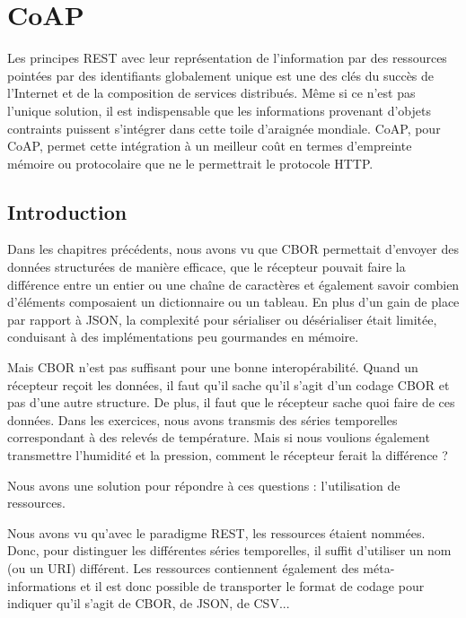 \chapter{CoAP}

Les principes \ac{REST} avec leur représentation de l'information par des ressources pointées par des identifiants globalement unique est une des clés du succès de l'Internet et de la composition de services distribués. Même si ce n'est pas l'unique solution, il est indispensable que les informations provenant d'objets contraints puissent s'intégrer dans cette toile d'araignée mondiale. \acs{CoAP}, pour \acl{CoAP}, permet cette intégration à un meilleur coût en termes d'empreinte mémoire ou protocolaire que ne le permettrait le protocole \ac{HTTP}.

\section{Introduction}

Dans les chapitres précédents, nous avons vu que \ac{CBOR} permettait d’envoyer des données structurées de manière efficace, que le récepteur pouvait faire la différence entre un entier ou une chaîne de caractères et également savoir combien d’éléments composaient un dictionnaire ou un tableau. En plus d’un gain de place par rapport à \ac{JSON}, la complexité pour sérialiser ou désérialiser était limitée, conduisant à des implémentations peu gourmandes en mémoire.

         \vspace{1em}


Mais CBOR n’est pas suffisant pour une bonne interopérabilité. Quand un récepteur reçoit les données, il faut qu'il sache qu’il s’agit d’un codage CBOR et pas d'une autre structure. De plus, il faut que le récepteur sache quoi faire de ces données. Dans les exercices, nous avons transmis des séries temporelles correspondant à des relevés de température. Mais si nous voulions également transmettre l’humidité et la pression, comment le récepteur ferait la différence ?

         \vspace{1em}

Nous avons une solution pour répondre à ces questions : l’utilisation de ressources.

         \vspace{1em}

Nous avons vu qu’avec le paradigme REST, les ressources étaient nommées. Donc, pour distinguer les différentes séries temporelles, il suffit d’utiliser un nom (ou un URI) différent. Les ressources contiennent également des méta-informations et il est donc possible de transporter le format de codage pour indiquer qu’il s’agit de \ac{CBOR}, de \ac{JSON}, de \ac{CSV}...

